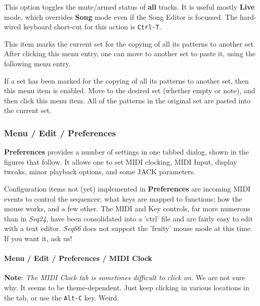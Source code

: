    This option toggles the mute/armed status of \textbf{all} tracks.
   It is useful mostly \textbf{Live} mode, which overrides \textbf{Song}
   mode even if the Song Editor is focussed.
   The hard-wired keyboard short-cut for this action is \texttt{Ctrl-T}.

   This item marks the current set for the copying of all its patterns to
   another set.
   After clicking this menu entry, one can move to another set to paste it,
   using the following menu entry.

   If a set has been marked for the copying of all its patterns to
   another set, then this menu item is enabled.
   Move to the desired set (whether empty or note), and then
   click this menu item.
   All of the patterns in the original set are pasted into the current set.

\subsubsection{Menu / Edit / Preferences}
\label{subsubsec:menu_edit_preferences}

   \textbf{Preferences} provides a number of settings in one
   tabbed dialog, shown in the figures that follow.
   It allows one to set MIDI clocking, MIDI Input, display tweaks, minor
   playback options, and some JACK parameters.

  Configuration items not (yet) implemented in \textbf{Preferences} are
      incoming MIDI events to control the sequencer;
      what keys are mapped to functions;
      how the mouse works, and a few other.
   The MIDI and Key controls, far more numerous than in \textsl{Seq24}, have
   been consolidated into a 'ctrl' file and are fairly easy to edit with a text
   editor.
   \textsl{Seq66} does not support the 'fruity' mouse mode at this time.
   If you want it, ask us!

\paragraph{Menu / Edit / Preferences / MIDI Clock}
\label{paragraph:menu_edit_preferences_midi_clock}

   \textbf{Note}:
   \textsl{The MIDI Clock tab is sometimes difficult to click on.}
   We are not sure why.  It seems to be theme-dependent.
   Just keep clicking in various locations in the tab,
   or use the \texttt{Alt-C} key.
   Weird.

